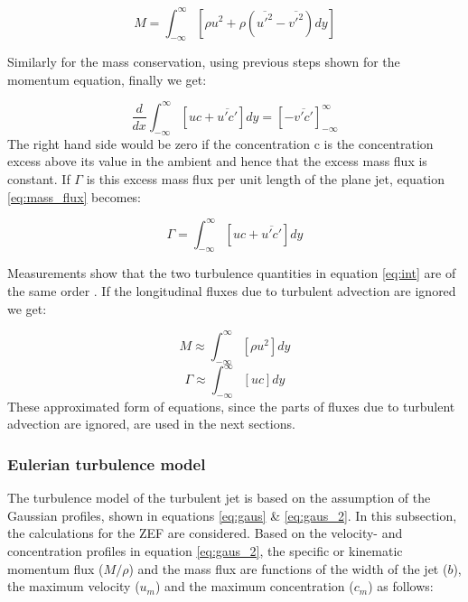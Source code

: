 \begin{equation}
    M= \int_{-\infty}^{\infty} [\rho u^2 + \rho (\overline{u'^2} - \overline{v'^2})dy] 
\end{equation}

\noindent Similarly for the mass conservation, using previous steps shown for the momentum equation, finally we get:

\begin{equation}
   \frac{d}{dx}\int_{-\infty}^{\infty} [uc + \overline{u'c'}]dy = [- \overline{v'c'}]_{-\infty}^{\infty}
   \label{eq:mass_flux}
\end{equation}
\noindent The right hand side would be zero if the concentration c is the concentration excess above its value in the ambient and hence that the excess mass flux is constant. If $\Gamma$ is this excess mass flux per unit length of the plane jet, equation \ref{eq:mass_flux} becomes:

\begin{equation}
   \Gamma = \int_{-\infty}^{\infty} [uc + \overline{u'c'}]dy
\end{equation}

\noindent Measurements show that the two turbulence quantities in equation \ref{eq:int} are of the same order \citep{Miller}. If the longitudinal fluxes due to turbulent advection are ignored we get:

\begin{equation}
    M \approx \int_{-\infty}^{\infty} [\rho u^2] dy
\end{equation}
\begin{equation}
    \Gamma \approx \int_{-\infty}^{\infty}  [uc]dy
\end{equation}
\noindent These approximated form of equations, since the parts of fluxes due to turbulent advection are ignored, are used in the next sections. \newline \newline













\subsubsection{Eulerian turbulence model} 
The turbulence model of the turbulent jet is based on the assumption of the Gaussian profiles, shown in equations \ref{eq:gaus} \& \ref{eq:gaus_2}. In this subsection, the calculations for the ZEF are considered. Based on the velocity- and concentration profiles in equation \ref{eq:gaus_2}, the specific or kinematic momentum flux ($M/\rho$) and the mass flux are functions of the width of the jet ($b$), the maximum velocity ($u_m$) and the maximum concentration ($c_m$) as follows:

